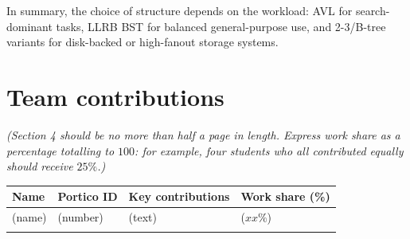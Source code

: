 \documentclass[12pt]{article}
\begin{document}
\bigskip
\noindent In summary, the choice of structure depends on the workload: AVL for search-dominant tasks, LLRB BST for balanced general-purpose use, and 2-3/B-tree variants for disk-backed or high-fanout storage systems.

\section{Team contributions}
\emph{(Section 4 should be no more than half a page in length. Express work share as a percentage totalling to $100$: for example, four students who all contributed equally should receive $25\%$.)}


\vspace{1cm}

\begin{tabular}{|l|l|l|l|}
\hline
{\bf Name} & {\bf Portico ID} & {\bf Key contributions} & {\bf Work share (\%)} \\[1mm]
\hline
(name)    &  (number)  & (text) & ($xx\%$) \\\hline
          &            &         &          \\
\hline
\end{tabular}
\end{document}
